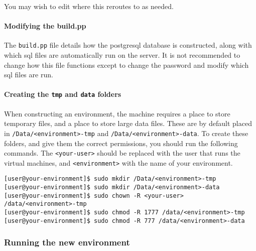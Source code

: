 \begin{Shaded}
\begin{Highlighting}[]
 \KeywordTok{>}
\end{Highlighting}
\end{Shaded}

You may wish to edit where this reroutes to as needed.

\paragraph{Modifying the build.pp}\label{modifying-the-build.pp}

The \texttt{build.pp} file details how the postgresql database is
constructed, along with which sql files are automatically run on the
server. It is not recommended to change how this file functions except
to change the password and modify which sql files are run.

\paragraph{\texorpdfstring{Creating the \texttt{tmp} and \texttt{data}
folders}{Creating the tmp and data folders}}\label{creating-the-tmp-and-data-folders}

When constructing an environment, the machine requires a place to store
temporary files, and a place to store large data files. These are by
default placed in
\texttt{/Data/\textless{}environment\textgreater{}-tmp} and
\texttt{/Data/\textless{}environment\textgreater{}-data}. To create
these folders, and give them the correct permissions, you should run the
following commands. The \texttt{\textless{}your-user\textgreater{}}
should be replaced with the user that runs the virtual machines, and
\texttt{\textless{}environment\textgreater{}} with the name of your
environment.

\begin{verbatim}
[user@your-environment]$ sudo mkdir /Data/<environment>-tmp
[user@your-environment]$ sudo mkdir /Data/<environment>-data
[user@your-environment]$ sudo chown -R <your-user> /data/<environment>-tmp
[user@your-environment]$ sudo chmod -R 1777 /data/<environment>-tmp
[user@your-environment]$ sudo chmod -R 777 /data/<environment>-data
\end{verbatim}

\subsubsection{Running the new
environment}\label{running-the-new-environment}

